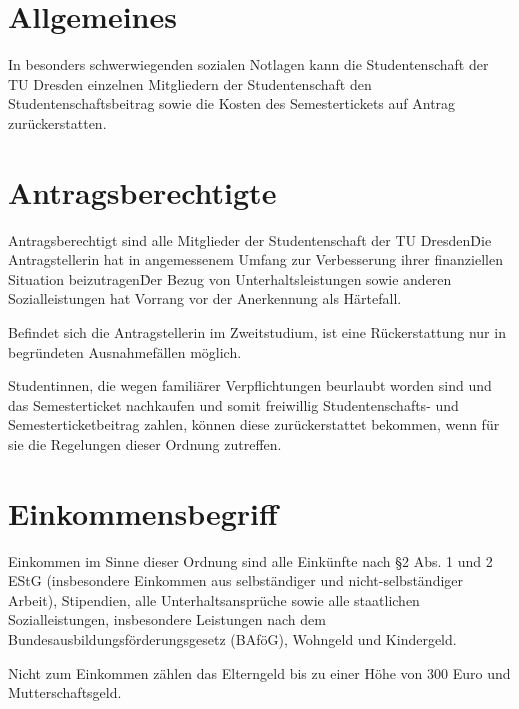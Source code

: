 \setcounter{section}{0}
\begin{multicols}{2}



\section{Allgemeines}

\Abs \Satz In besonders schwerwiegenden sozialen Notlagen kann die Studentenschaft der TU Dresden einzelnen Mitgliedern der Studentenschaft den Studentenschaftsbeitrag sowie die Kosten des Semestertickets auf Antrag zurückerstatten. 


\section{Antragsberechtigte}

\Abs \Satz Antragsberechtigt sind alle Mitglieder der Studentenschaft der TU Dresden\. Die Antragstellerin hat in angemessenem Umfang zur Verbesserung ihrer finanziellen Situation beizutragen\. Der Bezug von Unterhaltsleistungen sowie anderen Sozialleistungen hat Vorrang vor der Anerkennung als Härtefall.

\Abs \Satz Befindet sich die Antragstellerin im Zweitstudium, ist eine Rückerstattung nur in begründeten Ausnahmefällen möglich.

\Abs \Satz Studentinnen, die wegen familiärer Verpflichtungen beurlaubt worden sind und das Semesterticket nachkaufen und somit freiwillig Studentenschafts- und Semesterticketbeitrag zahlen, können diese zurückerstattet bekommen, wenn für sie die Regelungen dieser Ordnung zutreffen.


\section{Einkommensbegriff}

\Abs \Satz Einkommen im Sinne dieser Ordnung sind alle Einkünfte nach §2 Abs. 1 und 2 EStG (insbesondere Einkommen aus selbständiger und nicht-selbständiger Arbeit), Stipendien, alle Unterhaltsansprüche sowie alle staatlichen Sozialleistungen, insbesondere Leistungen nach dem Bundesausbildungsförderungsgesetz (BAföG), Wohngeld und Kindergeld.

\Abs \Satz Nicht zum Einkommen zählen das Elterngeld bis zu einer Höhe von 300 Euro und Mutterschaftsgeld.


\end{multicols}
